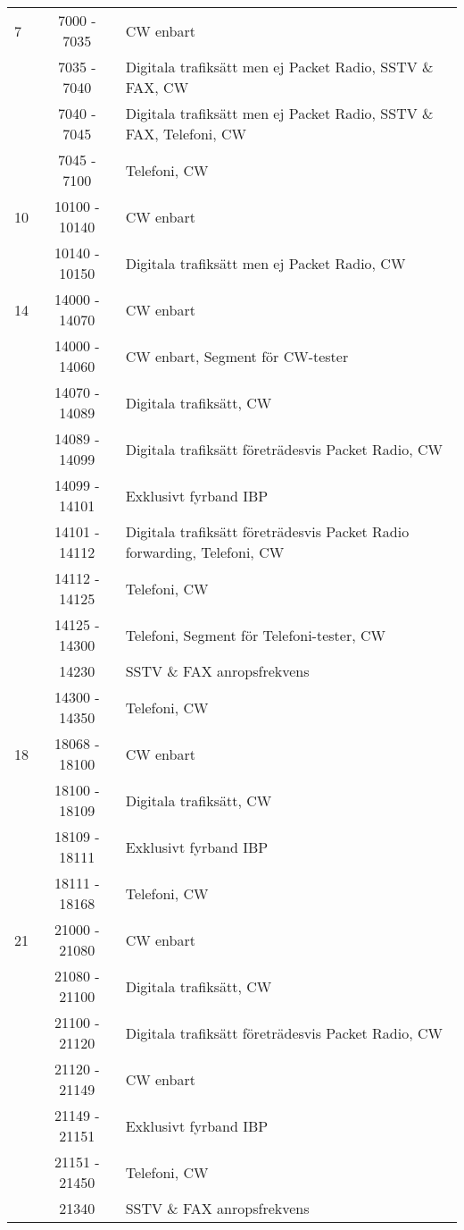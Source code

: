 \begin{longtable}{lcl}
7    & 7000 - 7035 & CW enbart \\
     & 7035 - 7040 & Digitala trafiksätt men ej Packet Radio, SSTV \& FAX, CW \\
     & 7040 - 7045 & Digitala trafiksätt men ej Packet Radio, SSTV \& FAX, Telefoni, CW \\
     & 7045 - 7100 & Telefoni, CW \\

10   & 10100 - 10140 & CW enbart \\
     & 10140 - 10150 & Digitala trafiksätt men ej Packet Radio, CW \\

14   & 14000 - 14070 & CW enbart \\
     & 14000 - 14060 & CW enbart, Segment för CW-tester \\
     & 14070 - 14089 & Digitala trafiksätt, CW \\
     & 14089 - 14099 & Digitala trafiksätt företrädesvis Packet Radio, CW \\
     & 14099 - 14101 & Exklusivt fyrband IBP \\
     & 14101 - 14112 & Digitala trafiksätt företrädesvis Packet Radio forwarding, Telefoni, CW \\
     & 14112 - 14125 & Telefoni, CW \\
     & 14125 - 14300 & Telefoni, Segment för Telefoni-tester, CW \\
     & 14230         & SSTV \& FAX anropsfrekvens \\
     & 14300 - 14350 & Telefoni, CW \\

18   & 18068 - 18100 & CW enbart \\
     & 18100 - 18109 & Digitala trafiksätt, CW \\
     & 18109 - 18111 & Exklusivt fyrband IBP \\
     & 18111 - 18168 & Telefoni, CW \\

21   & 21000 - 21080 & CW enbart \\
     & 21080 - 21100 & Digitala trafiksätt, CW \\
     & 21100 - 21120 & Digitala trafiksätt företrädesvis Packet Radio, CW \\
     & 21120 - 21149 & CW enbart \\
     & 21149 - 21151 & Exklusivt fyrband IBP \\
     & 21151 - 21450 & Telefoni, CW \\
     & 21340         & SSTV \& FAX anropsfrekvens \\


\end{longtable}
